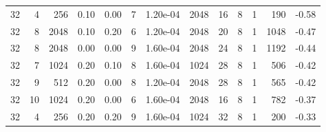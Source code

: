 \begin{appendices}
\begin{table}
\begin{tabular}{rrrrrrrrrrrrr}
32 & 4 & 256 & 0.10 & 0.00 & 7 & 1.20e-04 & 2048 & 16 & 8 & 1 & 190 & -0.58 \\
32 & 8 & 2048 & 0.10 & 0.20 & 6 & 1.20e-04 & 2048 & 20 & 8 & 1 & 1048 & -0.47 \\
32 & 8 & 2048 & 0.00 & 0.00 & 9 & 1.60e-04 & 2048 & 24 & 8 & 1 & 1192 & -0.44 \\
32 & 7 & 1024 & 0.20 & 0.10 & 8 & 1.60e-04 & 1024 & 28 & 8 & 1 & 506 & -0.42 \\
32 & 9 & 512 & 0.20 & 0.00 & 8 & 1.20e-04 & 2048 & 28 & 8 & 1 & 565 & -0.42 \\
32 & 10 & 1024 & 0.20 & 0.00 & 6 & 1.60e-04 & 2048 & 16 & 8 & 1 & 782 & -0.37 \\
32 & 4 & 256 & 0.20 & 0.20 & 9 & 1.60e-04 & 1024 & 32 & 8 & 1 & 200 & -0.33 \\
\bottomrule
\end{tabular}
\end{table}


\end{appendices}

